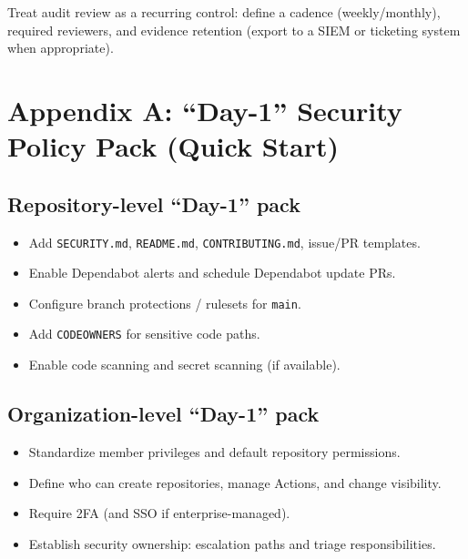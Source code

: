 \documentclass[11pt]{article}
\begin{document}
\begin{notebox}
Treat audit review as a recurring control: define a cadence (weekly/monthly), required reviewers, and evidence retention (export to a SIEM or ticketing system when appropriate).
\end{notebox}

\section{Appendix A: ``Day-1'' Security Policy Pack (Quick Start)}

\subsection{Repository-level ``Day-1'' pack}
\begin{checklistbox}[title={Repository Baseline}]
\begin{itemize}[leftmargin=*,itemsep=2pt]
  \item Add \texttt{SECURITY.md}, \texttt{README.md}, \texttt{CONTRIBUTING.md}, issue/PR templates.
  \item Enable Dependabot alerts and schedule Dependabot update PRs.
  \item Configure branch protections / rulesets for \texttt{main}.
  \item Add \texttt{CODEOWNERS} for sensitive code paths.
  \item Enable code scanning and secret scanning (if available).
\end{itemize}
\end{checklistbox}

\subsection{Organization-level ``Day-1'' pack}
\begin{checklistbox}[title={Organization Baseline}]
\begin{itemize}[leftmargin=*,itemsep=2pt]
  \item Standardize member privileges and default repository permissions.
  \item Define who can create repositories, manage Actions, and change visibility.
  \item Require 2FA (and SSO if enterprise-managed).
  \item Establish security ownership: escalation paths and triage responsibilities.
\end{itemize}
\end{checklistbox}
\end{document}
